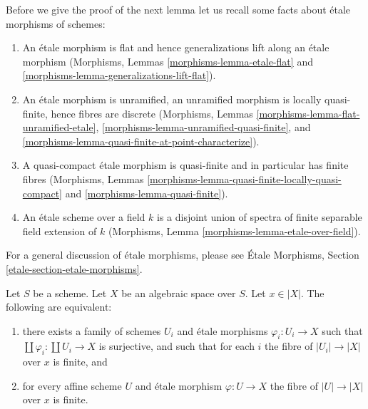 \begin{remark}
\label{remark-recall}
Before we give the proof of the next lemma let us recall some facts
about \'etale morphisms of schemes:
\begin{enumerate}
\item An \'etale morphism is flat and hence generalizations lift along
an \'etale morphism
(Morphisms, Lemmas \ref{morphisms-lemma-etale-flat}
and \ref{morphisms-lemma-generalizations-lift-flat}).
\item An \'etale morphism is unramified, an unramified morphism is locally
quasi-finite, hence fibres are discrete
(Morphisms, Lemmas \ref{morphisms-lemma-flat-unramified-etale},
\ref{morphisms-lemma-unramified-quasi-finite}, and
\ref{morphisms-lemma-quasi-finite-at-point-characterize}).
\item A quasi-compact \'etale morphism is quasi-finite and in particular
has finite fibres
(Morphisms, Lemmas \ref{morphisms-lemma-quasi-finite-locally-quasi-compact} and
\ref{morphisms-lemma-quasi-finite}).
\item An \'etale scheme over a field $k$ is a disjoint union of spectra
of finite separable field extension of $k$
(Morphisms, Lemma \ref{morphisms-lemma-etale-over-field}).
\end{enumerate}
For a general discussion of \'etale morphisms, please see
\'Etale Morphisms, Section \ref{etale-section-etale-morphisms}.
\end{remark}

\begin{lemma}
\label{lemma-U-finite-above-x}
Let $S$ be a scheme. Let $X$ be an algebraic space over $S$.
Let $x \in |X|$. The following are equivalent:
\begin{enumerate}
\item there exists a family of schemes $U_i$ and
\'etale morphisms $\varphi_i : U_i \to X$ such that
$\coprod \varphi_i : \coprod U_i \to X$ is surjective,
and such that for each $i$ the fibre of
$|U_i| \to |X|$ over $x$ is finite, and
\item for every affine scheme $U$ and \'etale morphism $\varphi : U \to X$
the fibre of $|U| \to |X|$ over $x$ is finite.
\end{enumerate}
\end{lemma}

